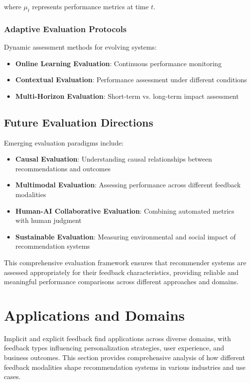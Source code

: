 \documentclass[acmsmall,review,anonymous]{acmart}
\begin{document}
where $\mu_t$ represents performance metrics at time $t$.

\subsubsection{Adaptive Evaluation Protocols}

Dynamic assessment methods for evolving systems:

\begin{itemize}
    \item \textbf{Online Learning Evaluation}: Continuous performance monitoring
    \item \textbf{Contextual Evaluation}: Performance assessment under different conditions
    \item \textbf{Multi-Horizon Evaluation}: Short-term vs. long-term impact assessment
\end{itemize}

\subsection{Future Evaluation Directions}

Emerging evaluation paradigms include:

\begin{itemize}
    \item \textbf{Causal Evaluation}: Understanding causal relationships between recommendations and outcomes
    \item \textbf{Multimodal Evaluation}: Assessing performance across different feedback modalities
    \item \textbf{Human-AI Collaborative Evaluation}: Combining automated metrics with human judgment
    \item \textbf{Sustainable Evaluation}: Measuring environmental and social impact of recommendation systems
\end{itemize}

This comprehensive evaluation framework ensures that recommender systems are assessed appropriately for their feedback characteristics, providing reliable and meaningful performance comparisons across different approaches and domains.

\section{Applications and Domains}
\label{sec:applications}

Implicit and explicit feedback find applications across diverse domains, with feedback types influencing personalization strategies, user experience, and business outcomes. This section provides comprehensive analysis of how different feedback modalities shape recommendation systems in various industries and use cases.
\end{document}
